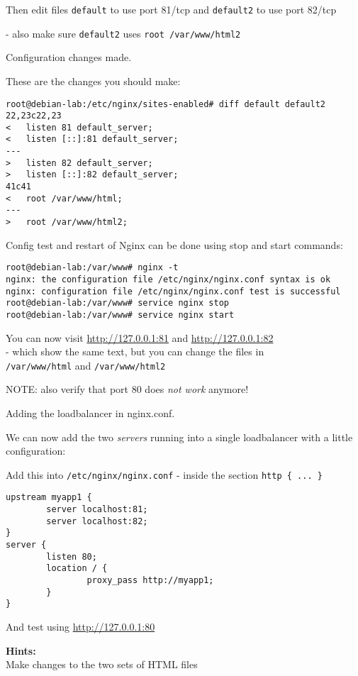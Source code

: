 \documentclass[a4paper,11pt,notitlepage]{report}
\begin{document}
Then edit files \verb+default+ to use port 81/tcp and \verb+default2+ to use port 82/tcp

- also make sure \verb+default2+ uses \verb+root /var/www/html2+

Configuration changes made.

These are the changes you should make:
\begin{verbatim}
root@debian-lab:/etc/nginx/sites-enabled# diff default default2
22,23c22,23
< 	listen 81 default_server;
< 	listen [::]:81 default_server;
---
> 	listen 82 default_server;
> 	listen [::]:82 default_server;
41c41
< 	root /var/www/html;
---
> 	root /var/www/html2;
\end{verbatim}



Config test and restart of Nginx can be done using stop and start commands:

\begin{verbatim}
root@debian-lab:/var/www# nginx -t
nginx: the configuration file /etc/nginx/nginx.conf syntax is ok
nginx: configuration file /etc/nginx/nginx.conf test is successful
root@debian-lab:/var/www# service nginx stop
root@debian-lab:/var/www# service nginx start
\end{verbatim}

You can now visit \url{http://127.0.0.1:81} and \url{http://127.0.0.1:82}\\
 - which show the same text, but you can change the files in \\
 \verb+/var/www/html+ and \verb+/var/www/html2+

NOTE: also verify that port 80 does \emph{not work} anymore!

Adding the loadbalancer in nginx.conf.

We can now add the two \emph{servers} running into a single loadbalancer with a little configuration:

Add this into \verb+/etc/nginx/nginx.conf+ - inside the section \verb+http { ... }+
\begin{verbatim}
upstream myapp1 {
        server localhost:81;
        server localhost:82;
}
server {
        listen 80;
        location / {
                proxy_pass http://myapp1;
        }
}
\end{verbatim}

And test using \url{http://127.0.0.1:80}



{\bf Hints:}\\
Make changes to the two sets of HTML files
\end{document}
